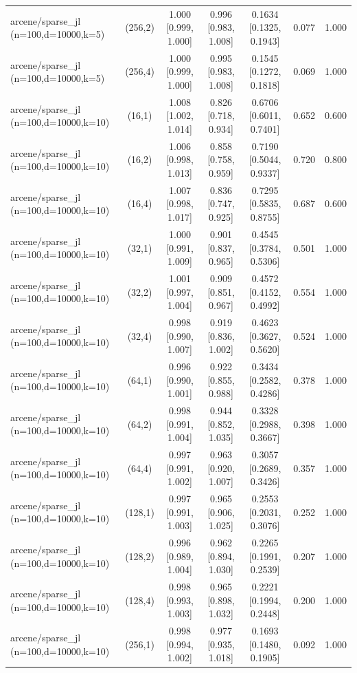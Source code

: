 \begin{tabular}{lcccccc}
arcene/sparse\_jl (n=100,d=10000,k=5) & (256,2) & 1.000 [0.999, 1.000] & 0.996 [0.983, 1.008] & 0.1634 [0.1325, 0.1943] & 0.077 & 1.000 \\
arcene/sparse\_jl (n=100,d=10000,k=5) & (256,4) & 1.000 [0.999, 1.000] & 0.995 [0.983, 1.008] & 0.1545 [0.1272, 0.1818] & 0.069 & 1.000 \\
arcene/sparse\_jl (n=100,d=10000,k=10) & (16,1) & 1.008 [1.002, 1.014] & 0.826 [0.718, 0.934] & 0.6706 [0.6011, 0.7401] & 0.652 & 0.600 \\
arcene/sparse\_jl (n=100,d=10000,k=10) & (16,2) & 1.006 [0.998, 1.013] & 0.858 [0.758, 0.959] & 0.7190 [0.5044, 0.9337] & 0.720 & 0.800 \\
arcene/sparse\_jl (n=100,d=10000,k=10) & (16,4) & 1.007 [0.998, 1.017] & 0.836 [0.747, 0.925] & 0.7295 [0.5835, 0.8755] & 0.687 & 0.600 \\
arcene/sparse\_jl (n=100,d=10000,k=10) & (32,1) & 1.000 [0.991, 1.009] & 0.901 [0.837, 0.965] & 0.4545 [0.3784, 0.5306] & 0.501 & 1.000 \\
arcene/sparse\_jl (n=100,d=10000,k=10) & (32,2) & 1.001 [0.997, 1.004] & 0.909 [0.851, 0.967] & 0.4572 [0.4152, 0.4992] & 0.554 & 1.000 \\
arcene/sparse\_jl (n=100,d=10000,k=10) & (32,4) & 0.998 [0.990, 1.007] & 0.919 [0.836, 1.002] & 0.4623 [0.3627, 0.5620] & 0.524 & 1.000 \\
arcene/sparse\_jl (n=100,d=10000,k=10) & (64,1) & 0.996 [0.990, 1.001] & 0.922 [0.855, 0.988] & 0.3434 [0.2582, 0.4286] & 0.378 & 1.000 \\
arcene/sparse\_jl (n=100,d=10000,k=10) & (64,2) & 0.998 [0.991, 1.004] & 0.944 [0.852, 1.035] & 0.3328 [0.2988, 0.3667] & 0.398 & 1.000 \\
arcene/sparse\_jl (n=100,d=10000,k=10) & (64,4) & 0.997 [0.991, 1.002] & 0.963 [0.920, 1.007] & 0.3057 [0.2689, 0.3426] & 0.357 & 1.000 \\
arcene/sparse\_jl (n=100,d=10000,k=10) & (128,1) & 0.997 [0.991, 1.003] & 0.965 [0.906, 1.025] & 0.2553 [0.2031, 0.3076] & 0.252 & 1.000 \\
arcene/sparse\_jl (n=100,d=10000,k=10) & (128,2) & 0.996 [0.989, 1.004] & 0.962 [0.894, 1.030] & 0.2265 [0.1991, 0.2539] & 0.207 & 1.000 \\
arcene/sparse\_jl (n=100,d=10000,k=10) & (128,4) & 0.998 [0.993, 1.003] & 0.965 [0.898, 1.032] & 0.2221 [0.1994, 0.2448] & 0.200 & 1.000 \\
arcene/sparse\_jl (n=100,d=10000,k=10) & (256,1) & 0.998 [0.994, 1.002] & 0.977 [0.935, 1.018] & 0.1693 [0.1480, 0.1905] & 0.092 & 1.000 \\

\end{tabular}
